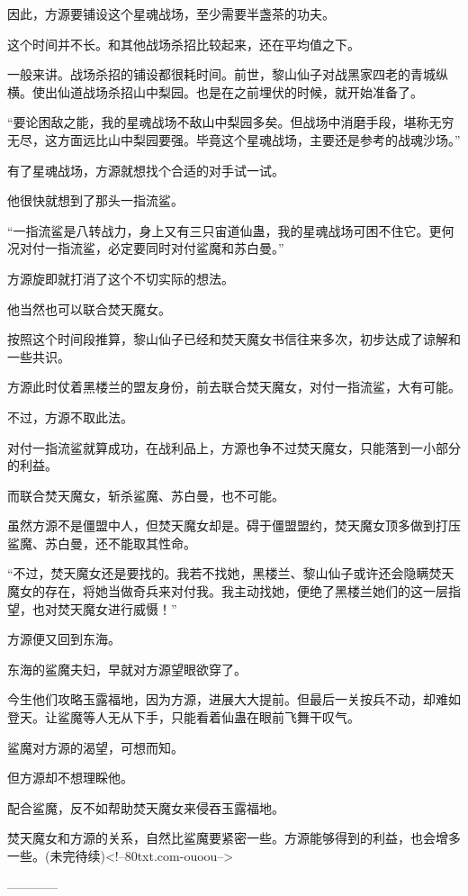 \begin{this_body}
因此，方源要铺设这个星魂战场，至少需要半盏茶的功夫。

这个时间并不长。和其他战场杀招比较起来，还在平均值之下。

一般来讲。战场杀招的铺设都很耗时间。前世，黎山仙子对战黑家四老的青城纵横。使出仙道战场杀招山中梨园。也是在之前埋伏的时候，就开始准备了。

“要论困敌之能，我的星魂战场不敌山中梨园多矣。但战场中消磨手段，堪称无穷无尽，这方面远比山中梨园要强。毕竟这个星魂战场，主要还是参考的战魂沙场。”

有了星魂战场，方源就想找个合适的对手试一试。

他很快就想到了那头一指流鲨。

“一指流鲨是八转战力，身上又有三只宙道仙蛊，我的星魂战场可困不住它。更何况对付一指流鲨，必定要同时对付鲨魔和苏白曼。”

方源旋即就打消了这个不切实际的想法。

他当然也可以联合焚天魔女。

按照这个时间段推算，黎山仙子已经和焚天魔女书信往来多次，初步达成了谅解和一些共识。

方源此时仗着黑楼兰的盟友身份，前去联合焚天魔女，对付一指流鲨，大有可能。

不过，方源不取此法。

对付一指流鲨就算成功，在战利品上，方源也争不过焚天魔女，只能落到一小部分的利益。

而联合焚天魔女，斩杀鲨魔、苏白曼，也不可能。

虽然方源不是僵盟中人，但焚天魔女却是。碍于僵盟盟约，焚天魔女顶多做到打压鲨魔、苏白曼，还不能取其性命。

“不过，焚天魔女还是要找的。我若不找她，黑楼兰、黎山仙子或许还会隐瞒焚天魔女的存在，将她当做奇兵来对付我。我主动找她，便绝了黑楼兰她们的这一层指望，也对焚天魔女进行威慑！”

方源便又回到东海。

东海的鲨魔夫妇，早就对方源望眼欲穿了。

今生他们攻略玉露福地，因为方源，进展大大提前。但最后一关按兵不动，却难如登天。让鲨魔等人无从下手，只能看着仙蛊在眼前飞舞干叹气。

鲨魔对方源的渴望，可想而知。

但方源却不想理睬他。

配合鲨魔，反不如帮助焚天魔女来侵吞玉露福地。

焚天魔女和方源的关系，自然比鲨魔要紧密一些。方源能够得到的利益，也会增多一些。(未完待续)<!--80txt.com-ouoou-->

------------

\end{this_body}

